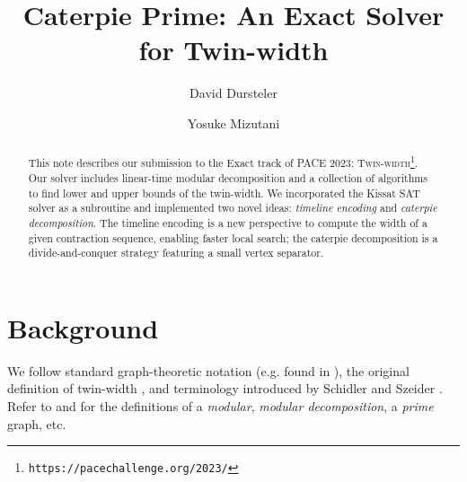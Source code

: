 \documentclass[a4paper,UKenglish,cleveref, autoref, thm-restate]{lipics-v2021}
\title{Caterpie Prime: An Exact Solver for Twin-width} %
\author{David Dursteler}{\universityOfUtah}{u1161522@utah.edu}{https://orcid.org/0009-0000-6471-1504}{}
\author{Yosuke Mizutani}{\universityOfUtah}{yos@cs.utah.edu}{https://orcid.org/0000-0002-9847-4890}{}
\begin{document}
\maketitle

\begin{abstract}
This note describes our submission to the Exact track of PACE 2023:
 \textsc{Twin-width}\footnote{%
\texttt{https://pacechallenge.org/2023/}}.
%
Our solver includes linear-time modular decomposition and
a collection of algorithms to find lower and upper bounds of the twin-width.
%
We incorporated the \textsf{Kissat} SAT solver \cite{biere_gimsatul_2022} as a subroutine
and implemented two novel ideas:
\emph{timeline encoding} and \emph{caterpie decomposition}.
%
The timeline encoding is a new perspective to compute the width of a given contraction
sequence, enabling faster local search;
the caterpie decomposition is a divide-and-conquer strategy featuring a small vertex separator.
\end{abstract}

\section{Background}
\label{sec:background}

We follow standard graph-theoretic notation (e.g. found in \cite{diestel2017graph}),
the original definition of twin-width \cite{bonnet_twin-width_2020,bonnet_twin-width_2021,
bonnet_twin-width_2021-1},
and terminology introduced by Schidler and Szeider \cite{schidler_sat_2021}.
%
Refer to \cite{habib_survey_2010} and \cite{tedder_simple_2008} for the definitions of
a \emph{modular}, \emph{modular decomposition}, a \emph{prime} graph, etc.
\end{document}
